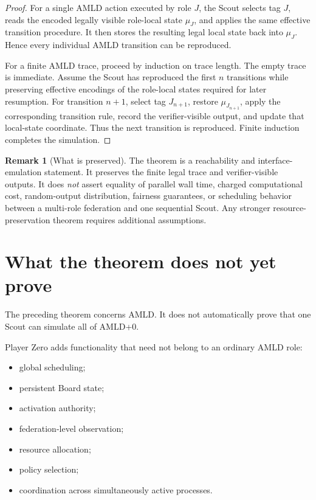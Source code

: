 \documentclass[11pt]{article}
\theoremstyle{definition}
\newtheorem{remark}[theorem]{Remark}
\begin{document}
\begin{proof}
For a single AMLD action executed by role $J$, the Scout selects tag $J$, reads the encoded legally visible role-local state $\mu_J$, and applies the same effective transition procedure. It then stores the resulting legal local state back into $\mu_J$. Hence every individual AMLD transition can be reproduced.

For a finite AMLD trace, proceed by induction on trace length. The empty trace is immediate. Assume the Scout has reproduced the first $n$ transitions while preserving effective encodings of the role-local states required for later resumption. For transition $n+1$, select tag $J_{n+1}$, restore $\mu_{J_{n+1}}$, apply the corresponding transition rule, record the verifier-visible output, and update that local-state coordinate. Thus the next transition is reproduced. Finite induction completes the simulation.
\end{proof}

\begin{remark}[What is preserved]
The theorem is a reachability and interface-emulation statement. It preserves the finite legal trace and verifier-visible outputs. It does \emph{not} assert equality of parallel wall time, charged computational cost, random-output distribution, fairness guarantees, or scheduling behavior between a multi-role federation and one sequential Scout. Any stronger resource-preservation theorem requires additional assumptions.
\end{remark}

\section{What the theorem does not yet prove}

The preceding theorem concerns AMLD. It does not automatically prove that one Scout can simulate all of AMLD+0.

Player Zero adds functionality that need not belong to an ordinary AMLD role:
\begin{itemize}
\item global scheduling;
\item persistent Board state;
\item activation authority;
\item federation-level observation;
\item resource allocation;
\item policy selection;
\item coordination across simultaneously active processes.
\end{itemize}
\end{document}

